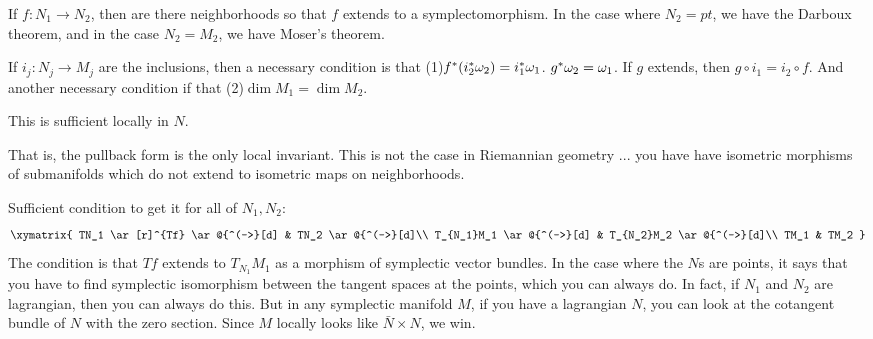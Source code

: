 If $f:N_1\to N_2$, then are there neighborhoods so that $f$
 extends to a symplectomorphism.  In the case where $N_2=pt$, we
 have the Darboux theorem, and in the case $N_2=M_2$, we have
 Moser's theorem.

 If $i_j:N_j\to M_j$ are the inclusions, then a necessary
 condition is that (1)$f^*(i_2^*\omega_2)=i^*_1\omega_1$.  $g^*\omega_2=\omega_1$.
 If $g$ extends, then $g\circ i_1=i_2\circ f$.  And another
 necessary condition if that (2)$\dim M_1=\dim M_2$.

 \begin{theorem}[Givental]
   This is sufficient locally in $N$.
 \end{theorem}

 That is, the pullback form is the only local invariant.  This is
 not the case in Riemannian geometry ... you have have isometric
 morphisms of submanifolds which do not extend to isometric
 maps on neighborhoods.

 Sufficient condition to get it for all of $N_1,N_2$:
 \[\xymatrix{
 TN_1 \ar[r]^{Tf} \ar@{^(->}[d] & TN_2 \ar@{^(->}[d]\\
 T_{N_1}M_1 \ar@{^(->}[d] & T_{N_2}M_2 \ar@{^(->}[d]\\
 TM_1 & TM_2
 }\]
 The condition is that $Tf$ extends to $T_{N_1}M_1$ as a morphism
 of symplectic vector bundles.  In the case where the $N$s are
 points, it says that you have to find symplectic isomorphism
 between the tangent spaces at the points, which you can always
 do.  In fact, if $N_1$ and $N_2$ are lagrangian, then you can
 always do this.  But in any symplectic manifold $M$, if you have
 a lagrangian $N$, you can look at the cotangent bundle of $N$
 with the zero section.  Since $M$ locally looks like $\bar
 N\times N$, we win.

